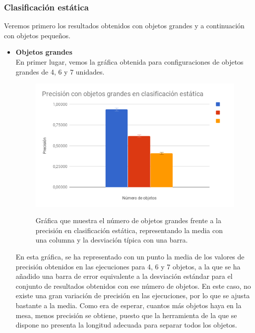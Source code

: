 \subsubsection{Clasificación estática}
\noindent Veremos primero los resultados obtenidos con objetos grandes y a continuación con objetos pequeños. \\
\begin{itemize}
	\item \textbf{Objetos grandes} \\
	\noindent En primer lugar, vemos la gráfica obtenida para configuraciones de objetos grandes de 4, 6 y 7 unidades. \\
	\begin{figure}[H]
		\centering %
		\label{cd:eg}
		\includegraphics[scale=0.55]{imagenes/errbar_eg.png}
		\caption{Gráfica que muestra el número de objetos grandes frente a la precisión en clasificación estática, representando la media con una columna y la desviación típica con una barra.}
	\end{figure}

	\noindent En esta gráfica, se ha representado con un punto la media de los valores de precisión obtenidos en las ejecuciones para 4, 6 y 7 objetos, a la que se ha añadido una barra de error equivalente a la desviación estándar para el conjunto de resultados obtenidos con ese número de objetos. En este caso, no existe una gran variación de precisión en las ejecuciones, por lo que se ajusta bastante a la media. Como era de esperar, cuantos más objetos haya en la mesa, menos precisión se obtiene, puesto que la herramienta de la que se dispone no presenta la longitud adecuada para separar todos los objetos. \\
	

\end{itemize}
